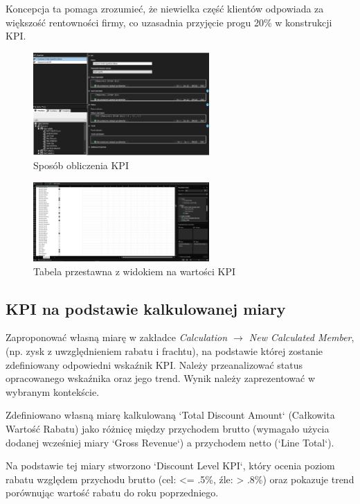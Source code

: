 \documentclass[a4paper,12pt]{article}
\begin{document}
Koncepcja ta pomaga zrozumieć, że niewielka część klientów odpowiada za większość rentowności firmy, co uzasadnia przyjęcie progu 20\% w konstrukcji KPI. \cite{whale_curve}

\begin{figure}[H]
  \includegraphics[width=0.6\textwidth]{images/5a.png}
  \caption{Sposób obliczenia KPI}
\end{figure}

\begin{figure}[H]
  \includegraphics[width=0.6\textwidth]{images/5a_analysis.png}
  \caption{Tabela przestawna z widokiem na wartości KPI}
\end{figure}

\subsection{KPI na podstawie kalkulowanej miary}

Zaproponować własną miarę w zakładce \textit{Calculation $\rightarrow$ New Calculated Member},
(np. zysk z uwzględnieniem rabatu i frachtu), na podstawie której zostanie zdefiniowany odpowiedni wskaźnik KPI. Należy przeanalizować status opracowanego wskaźnika oraz jego trend. Wynik należy zaprezentować w wybranym kontekście.

Zdefiniowano własną miarę kalkulowaną `Total Discount Amount` (Całkowita Wartość Rabatu) jako różnicę między przychodem brutto (wymagało użycia dodanej wcześniej miary `Gross Revenue`) a przychodem netto (`Line Total`).

Na podstawie tej miary stworzono `Discount Level KPI`, który ocenia poziom rabatu względem przychodu brutto (cel: <= .5\%, źle: > .8\%) oraz pokazuje trend porównując wartość rabatu do roku poprzedniego.
\end{document}
